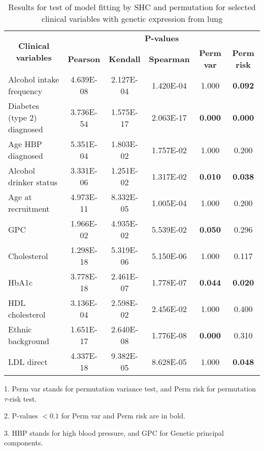     \begin{table}[htbp]
      \centering
      \caption{Results for test of model fitting by SHC and permutation for selected clinical variables with genetic expression from lung}
      \begin{threeparttable}
        \begin{tabular}{lccccc}
        \toprule
        \multicolumn{1}{c}{\multirow{2}[0]{*}{\textbf{Clinical variables}}} & \multicolumn{5}{c}{\textbf{P-values}} \\
              & \textbf{Pearson} & \textbf{Kendall } & \textbf{Spearman } & \textbf{Perm var} & \textbf{Perm risk } \\
        \midrule
        Alcohol intake frequency & 4.639E-08 & 2.127E-04 & 1.420E-04 & 1.000 & \textbf{0.092} \\
        Diabetes (type 2) diagnosed  & 3.736E-54 & 1.575E-17 & 2.063E-17 & \textbf{0.000} & \textbf{0.000} \\
        Age HBP diagnosed & 5.351E-04 & 1.803E-02 & 1.757E-02 & 1.000 & 0.200 \\
        Alcohol drinker status & 3.331E-06 & 1.251E-02 & 1.317E-02 & \textbf{0.010} & \textbf{0.038} \\
        Age at recruitment & 4.973E-11 & 8.332E-05 & 1.005E-04 & 1.000 & 0.200 \\
        GPC   & 1.966E-02 & 4.935E-02 & 5.539E-02 & \textbf{0.050} & 0.296 \\
        Cholesterol & 1.298E-18 & 5.319E-06 & 5.150E-06 & 1.000 & 0.117 \\
        HbA1c & 3.778E-18 & 2.461E-07 & 1.778E-07 & \textbf{0.044} & \textbf{0.020} \\
        HDL cholesterol & 3.136E-04 & 2.598E-02 & 2.456E-02 & 1.000 & 0.400 \\
        Ethnic background & 1.651E-17 & 2.640E-08 & 1.776E-08 & \textbf{0.000} & 0.310 \\
        LDL direct & 4.337E-18 & 9.382E-05 & 8.628E-05 & 1.000 & \textbf{0.048} \\
        \bottomrule
        \end{tabular}%
      \end{threeparttable}
      \begin{tablenotes}
        \small
        \item 1. Perm var stands for permutation variance test, and Perm risk for permutation $\tau$-risk test. 
        \item 2. P-values $< 0.1$ for Perm var and Perm risk are in bold.
        \item 3. HBP stands for high blood pressure, and GPC for Genetic principal components.
      \end{tablenotes}
      \label{tab:ite_lung_result}%
    \end{table}%

